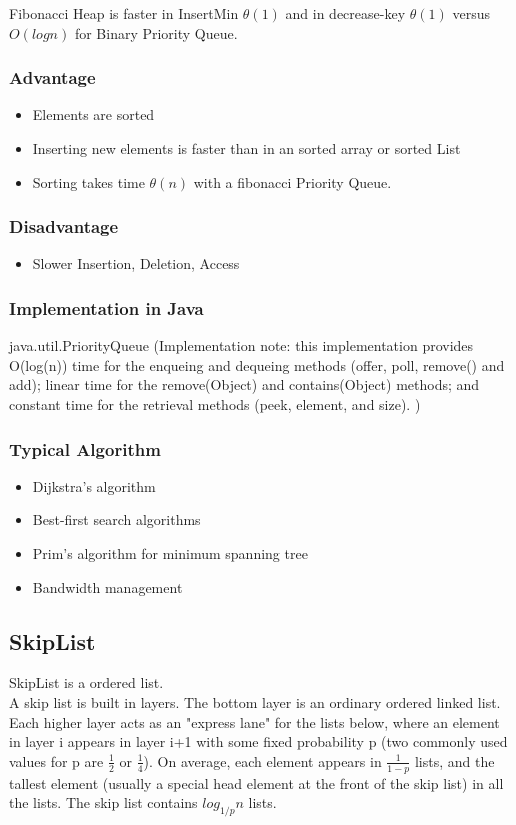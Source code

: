 \documentclass[12pt,a4paper]{article}
\newcommand{\AdvantageHead}{Advantage}
\newcommand{\DisadvantageHead}{Disadvantage}
\newcommand{\ImplementationInJavaHead}{Implementation in Java}
\newcommand{\TypicalAlgorithmHead}{Typical Algorithm}
\begin{document}
Fibonacci Heap is faster in InsertMin $\theta (1)$ and in decrease-key $\theta (1)$ versus$O(log n)$ for Binary Priority Queue.  	

\subsubsection{\AdvantageHead}
\begin{itemize}
\item Elements are sorted
\item Inserting new elements is faster than in an sorted array or sorted List
\item Sorting takes time $\theta (n)$ with a fibonacci Priority Queue.
\end{itemize}
\subsubsection{\DisadvantageHead}
\begin{itemize}
\item Slower Insertion, Deletion, Access
\end{itemize}
\subsubsection{\ImplementationInJavaHead}
java.util.PriorityQueue (Implementation note: this implementation provides O(log(n)) time for the enqueing and dequeing methods (offer, poll, remove() and add); linear time for the remove(Object) and contains(Object) methods; and constant time for the retrieval methods (peek, element, and size). )
\subsubsection{\TypicalAlgorithmHead}
\begin{itemize}
\item Dijkstra's algorithm
\item Best-first search algorithms
\item Prim's algorithm for minimum spanning tree
\item Bandwidth management
\end{itemize}

\subsection{SkipList}
SkipList is a ordered list.\\
A skip list is built in layers. The bottom layer is an ordinary ordered linked list. Each higher layer acts as an "express lane" for the lists below, where an element in layer i appears in layer i+1 with some fixed probability p (two commonly used values for p are $\frac{1}{2}$ or $\frac{1}{4}$). On average, each element appears in $\frac{1}{1-p}$ lists, and the tallest element (usually a special head element at the front of the skip list) in all the lists. The skip list contains $log_{1/p}n$ lists.
\end{document}
